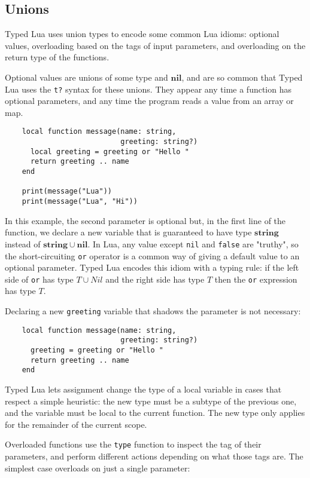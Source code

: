 \documentclass[preprint]{sig-alternate}
\newcommand{\Nil}{\mathbf{nil}}
\newcommand{\String}{\mathbf{string}}
\begin{document}
\subsection{Unions}

Typed Lua uses union types to encode some common Lua idioms:
optional values, overloading based on the tags of input parameters,
and overloading on the return type of the functions.

Optional values are unions of some type and $\Nil$, and are so
common that Typed Lua uses the {\tt t?} syntax for these unions.
They appear any time a function has optional parameters, and
any time the program reads a value from an array or map.

\begin{verbatim}
    local function message(name: string,
                           greeting: string?)
      local greeting = greeting or "Hello "
      return greeting .. name
    end
    
    print(message("Lua"))
    print(message("Lua", "Hi"))
\end{verbatim}

In this example, the second parameter is optional but, in the first
line of the function, we declare a new variable that is guaranteed to
have type $\String$ instead of $\String \cup \Nil$. In Lua, any value
except {\tt nil} and {\tt false} are "truthy", so the short-circuiting
{\tt or} operator is a common way of giving a default value to an
optional parameter. Typed Lua encodes this idiom with a typing rule: if
the left side of {\tt or} has type $T \cup Nil$ and the right side
has type $T$ then the {\tt or} expression has type $T$.

Declaring a new {\tt greeting} variable that shadows the parameter
is not necessary:

\begin{verbatim}
    local function message(name: string, 
                           greeting: string?)
      greeting = greeting or "Hello "
      return greeting .. name
    end
\end{verbatim}

Typed Lua lets assignment change the type of a local variable in
cases that respect a simple heuristic: the new type must be a
subtype of the previous one, and the variable must be local
to the current function. The new type only applies for the
remainder of the current scope.

Overloaded functions use the {\tt type} function to inspect
the tag of their parameters, and perform different actions
depending on what those tags are. The simplest case overloads
on just a single parameter:
\end{document}
